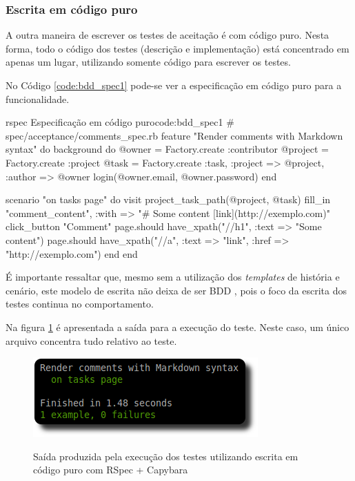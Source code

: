 \subsubsection{Escrita em código puro}
\label{ssub:Escrita em codigo puro}

A outra maneira de escrever os testes de aceitação é com código puro. Nesta forma, todo o código dos testes (descrição e implementação) está concentrado em apenas um lugar, utilizando somente código para escrever os testes.

No Código \ref{code:bdd_spec1} pode-se ver a especificação em código puro para a funcionalidade.

\begin{mycode}{rspec}%
{Especificação em código puro}{code:bdd_spec1}
# spec/acceptance/comments_spec.rb
feature "Render comments with Markdown syntax" do
  background do
    @owner = Factory.create :contributor
    @project = Factory.create :project
    @task = Factory.create :task, :project => @project, :author => @owner
    login(@owner.email, @owner.password)
  end

  scenario "on tasks page" do
    visit project_task_path(@project, @task)
    fill_in "comment_content", :with => "# Some content [link](http://exemplo.com)"
    click_button "Comment"
    page.should have_xpath("//h1", :text => "Some content")
    page.should have_xpath("//a", :text => "link", :href => "http://exemplo.com")
  end
end
\end{mycode}

É importante ressaltar que, mesmo sem a utilização dos \textit{templates} de história e cenário, este modelo de escrita não deixa de ser BDD \cite{BDDSolis}, pois o foco da escrita dos testes continua no comportamento.

Na figura \ref{img:rspec-acceptance-exec} é apresentada a saída para a execução do teste. Neste caso, um único arquivo concentra tudo relativo ao teste.

\begin{figure}[h]
  \center
  \caption{Saída produzida pela execução dos testes utilizando escrita em código puro com RSpec + Capybara}
  \includegraphics[scale=0.6]{images/rspec-acceptance-exec}
  \label{img:rspec-acceptance-exec}
\end{figure}


